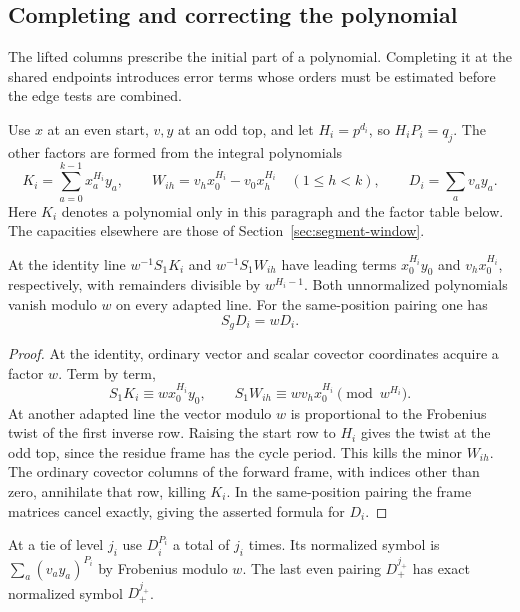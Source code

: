 \subsection{Completing and correcting the polynomial}
\label{sec:symbol-correction}
\hypertarget{source-symbol-correction}{}

The lifted columns prescribe the initial part of a polynomial. Completing it at the shared endpoints introduces error terms whose orders must be estimated before the edge tests are combined.

Use \(x\) at an even start, \(v,y\) at an odd top, and let
\(H_i=p^{d_i}\), so \(H_iP_i=q_j\). The other factors are
formed from the integral polynomials
\[
 K_i=\sum_{a=0}^{k-1}x_a^{H_i}y_a,\qquad
 W_{ih}=v_hx_0^{H_i}-v_0x_h^{H_i}\quad(1\le h<k),\qquad
 D_i=\sum_a v_a y_a .
\]
Here \(K_i\) denotes a polynomial only in this paragraph and the
factor table below. The capacities elsewhere are those of
Section~\ref{sec:segment-window}.

\begin{lemma}
At the identity line \(w^{-1}S_1K_i\) and \(w^{-1}S_1W_{ih}\)
have leading terms \(x_0^{H_i}y_0\) and \(v_h x_0^{H_i}\),
respectively, with remainders divisible by \(w^{H_i-1}\).
Both unnormalized polynomials vanish modulo \(w\) on every
adapted line. For the same-position pairing one has
\[
 S_gD_i=wD_i.
\]

\end{lemma}
\begin{proof}
At the identity, ordinary vector and scalar covector coordinates
acquire a factor \(w\). Term by term,
\[
  S_1K_i\equiv w x_0^{H_i}y_0,\qquad
  S_1W_{ih}\equiv w v_hx_0^{H_i}\pmod {w^{H_i}} .
\]
At another adapted line the vector modulo \(w\) is proportional
to the Frobenius twist of the first inverse row. Raising the
start row to \(H_i\) gives the twist at the odd top, since the
residue frame has the cycle period. This kills the minor \(W_{ih}\).
The ordinary covector columns of the forward frame, with indices
other than zero, annihilate that row, killing \(K_i\). In the
same-position pairing the frame matrices cancel exactly, giving
the asserted formula for \(D_i\).
\end{proof}

At a tie of level \(j_i\) use \(D_i^{P_i}\) a total of \(j_i\)
times. Its normalized symbol is \(\sum_a(v_ay_a)^{P_i}\) by
Frobenius modulo \(w\). The last even pairing \(D_+^{j_+}\) has
exact normalized symbol \(D_+^{j_+}\).

